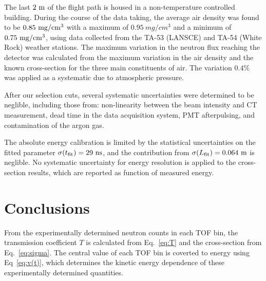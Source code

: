 \documentclass[%
 reprint,
superscriptaddress,
 preprintnumbers,
 nofootinbib,
 nobibnotes,
 bibnotes,
 amsmath,amssymb,
 aps,
 prl, 
 floatfix,
]{revtex4-1}
\begin{document}
The last $2~\rm m$ of the flight path is housed in a non-temperature
controlled building.  During the course of the data taking, the
average air density was found to be $0.85~{\rm mg/cm^3}$ with a maximum of
$0.95 \ mg/cm^3$ and a minimum of $0.75~{\rm mg/cm^3}$, using data
collected from the TA-53 (LANSCE) and TA-54 (White Rock) weather
stations.  The maximum variation in the neutron flux reaching the
detector was calculated from the maximum variation in the air density
and the known cross-section for the three main constituents of air.
The variation $0.4\%$ was applied as a systematic due to atmospheric
pressure.

After our selection cuts, several systematic uncertainties were
determined to be neglible, including those from: non-linearity between
the beam intensity and CT measurement, dead time in the data
acquisition system, PMT afterpulsing, and contamination of the argon
gas.

The absolute energy calibration is limited by the statistical
uncertainties on the fitted parameter $\sigma(t_{\rm fit})=29~\rm ns$,
and the contribution from $\sigma(L_{\rm fit})=0.064~\rm m$ is
neglible.  No systematic uncertainty for energy resolution is applied
to the cross-section results, which are reported as function of
measured energy.


\section{\label{sec:energy}Conclusions}

From the experimentally determined neutron counts in each TOF bin, the
transmission coefficient $T$ is calculated from Eq.~\ref{eq:T} and the
cross-section from Eq.~\ref{eq:sigma}.  The central value of each TOF
bin is coverted to energy using Eq~\ref{eq:v(t)}, which determines the
kinetic energy dependence of these experimentally determined
quantities.
\end{document}
